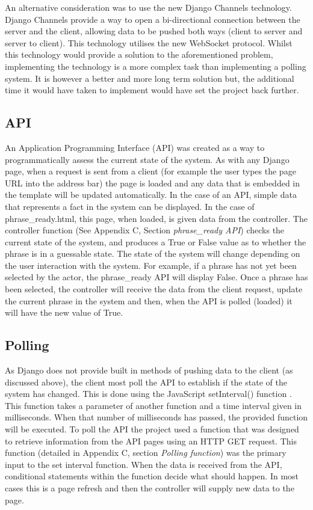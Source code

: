 An alternative consideration was to use the new Django Channels technology. Django Channels provide a way to open a bi-directional connection between the server and the client, allowing data to be pushed both ways (client to server and server to client)\cite{django_channels}. This technology utilises the new WebSocket protocol. Whilst this technology would provide a solution to the aforementioned problem, implementing the technology is a more complex task than implementing a polling system. It is however a better and more long term solution but, the additional time it would have taken to implement would have set the project back further.

\subsection{API}
An Application Programming Interface (API) was created as a way to programmatically assess the current state of the system. As with any Django page, when a request is sent from a client (for example the user types the page URL into the address bar) the page is loaded and any data that is embedded in the template will be updated automatically. In the case of an API, simple data that represents a fact in the system can be displayed. In the case of phrase\_ready.html, this page, when loaded, is given data from the controller. The controller function (See Appendix C, Section \textit{phrase\_ready API}) checks the current state of the system, and produces a True or False value as to whether the phrase is in a guessable state. The state of the system will change depending on the user interaction with the system. For example, if a phrase has not yet been selected by the actor, the phrase\_ready API will display False. Once a phrase has been selected, the controller will receive the data from the client request, update the current phrase in the system and then, when the API is polled (loaded) it will have the new value of True.

\subsection{Polling}
As Django does not provide built in methods of pushing data to the client (as discussed above), the client most poll the API to establish if the state of the system has changed. This is done using the JavaScript setInterval() function \cite{js_setinterval}. This function takes a parameter of another function and a time interval given in milliseconds. When that number of milliseconds has passed, the provided function will be executed. To poll the API the project used a function that was designed to retrieve information from the API pages using an HTTP GET request. This function (detailed in Appendix C, section \textit{Polling function}) was the primary input to the set interval function. When the data is received from the API, conditional statements within the function decide what should happen. In most cases this is a page refresh and then the controller will supply new data to the page.

